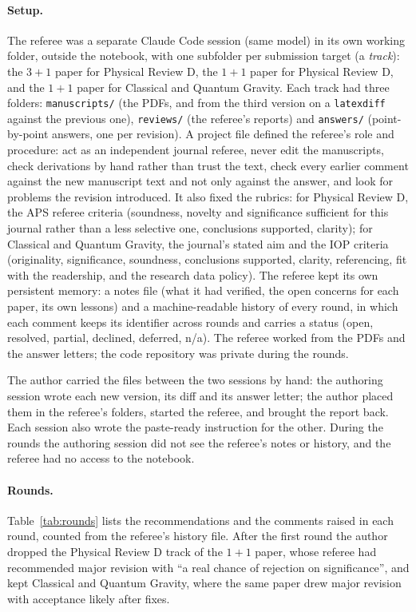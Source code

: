 \documentclass[11pt,a4paper]{article}
\begin{document}
\paragraph{Setup.} The referee was a separate Claude Code session (same model) in its own working folder, outside the notebook, with one subfolder per submission target (a \emph{track}): the $3+1$ paper for Physical Review D, the $1+1$ paper for Physical Review D, and the $1+1$ paper for Classical and Quantum Gravity. Each track had three folders: \texttt{manuscripts/} (the PDFs, and from the third version on a \texttt{latexdiff} against the previous one), \texttt{reviews/} (the referee's reports) and \texttt{answers/} (point-by-point answers, one per revision). A project file defined the referee's role and procedure: act as an independent journal referee, never edit the manuscripts, check derivations by hand rather than trust the text, check every earlier comment against the new manuscript text and not only against the answer, and look for problems the revision introduced. It also fixed the rubrics: for Physical Review D, the APS referee criteria (soundness, novelty and significance sufficient for this journal rather than a less selective one, conclusions supported, clarity); for Classical and Quantum Gravity, the journal's stated aim and the IOP criteria (originality, significance, soundness, conclusions supported, clarity, referencing, fit with the readership, and the research data policy). The referee kept its own persistent memory: a notes file (what it had verified, the open concerns for each paper, its own lessons) and a machine-readable history of every round, in which each comment keeps its identifier across rounds and carries a status (open, resolved, partial, declined, deferred, n/a). The referee worked from the PDFs and the answer letters; the code repository was private during the rounds.

The author carried the files between the two sessions by hand: the authoring session wrote each new version, its diff and its answer letter; the author placed them in the referee's folders, started the referee, and brought the report back. Each session also wrote the paste-ready instruction for the other. During the rounds the authoring session did not see the referee's notes or history, and the referee had no access to the notebook.

\paragraph{Rounds.} Table~\ref{tab:rounds} lists the recommendations and the comments raised in each round, counted from the referee's history file. After the first round the author dropped the Physical Review D track of the $1+1$ paper, whose referee had recommended major revision with ``a real chance of rejection on significance'', and kept Classical and Quantum Gravity, where the same paper drew major revision with acceptance likely after fixes.
\end{document}
